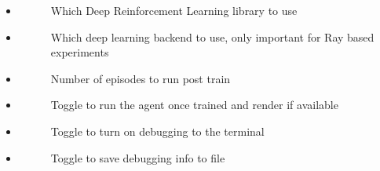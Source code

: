 \documentclass[letterpaper,10pt,english]{sphinxmanual}
\begin{document}
\begin{itemize}
\begin{description}
\end{description}

\item {} \begin{description}
\item[{}] \leavevmode
\sphinxAtStartPar
Which Deep Reinforcement Learning library to use

\end{description}

\item {} \begin{description}
\item[{}] \leavevmode
\sphinxAtStartPar
Which deep learning backend to use, only important for Ray based experiments

\end{description}

\item {} \begin{description}
\item[{}] \leavevmode
\sphinxAtStartPar
Number of episodes to run post train

\end{description}

\item {} \begin{description}
\item[{}] \leavevmode
\sphinxAtStartPar
Toggle to run the agent once trained and render if available

\end{description}

\item {} \begin{description}
\item[{}] \leavevmode
\sphinxAtStartPar
Toggle to turn on debugging to the terminal

\end{description}

\item {} \begin{description}
\item[{}] \leavevmode
\sphinxAtStartPar
Toggle to save debugging info to file


\end{description}
\end{itemize}
\end{document}
